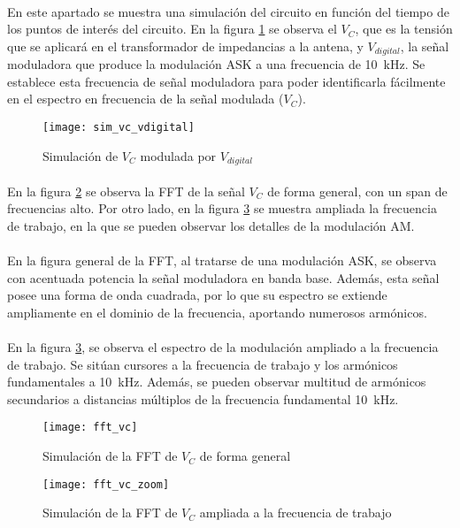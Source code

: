 \paragraph{}
En este apartado se muestra una simulación del circuito en función del tiempo de los puntos de interés del circuito. 
En la figura \ref{fig:sim_vc_vdig} se observa el $V_C$, que es la tensión que se aplicará en el transformador de impedancias a la antena, y $V_{digital}$, la señal moduladora que produce la modulación ASK a una frecuencia de \SI{10}{\kilo\hertz}. Se establece esta frecuencia de señal moduladora para poder identificarla fácilmente en el espectro en frecuencia de la señal modulada ($V_C$).
\begin{figure}[h]
    \centering
    \texttt{[image: sim\_vc\_vdigital]}
    \caption{Simulaci\'on de $V_C$ modulada por $V_{digital}$}
    \label{fig:sim_vc_vdig}
\end{figure}
\paragraph{}
En la figura \ref{fig:sim_fft} se observa la FFT de la señal $V_C$ de forma general, con un span de frecuencias alto. Por otro lado, en la figura \ref{fig:sim_fft_zoom} se muestra ampliada la frecuencia de trabajo, en la que se pueden observar los detalles de la modulación AM.
\paragraph{}
En la figura general de la FFT, al tratarse de una modulación ASK, se observa con acentuada potencia la señal moduladora en banda base. Además, esta señal posee una forma de onda cuadrada, por lo que su espectro se extiende ampliamente en el dominio de la frecuencia, aportando numerosos armónicos.
\paragraph{}
En la figura \ref{fig:sim_fft_zoom}, se observa el espectro de la modulación ampliado a la frecuencia de trabajo. Se sitúan cursores a la frecuencia de trabajo y los armónicos fundamentales a \SI{10}{\kilo\hertz}. Además, se pueden observar multitud de armónicos secundarios a distancias múltiplos de la frecuencia fundamental \SI{10}{\kilo\hertz}.
\begin{figure}[h!]
    \centering
    \texttt{[image: fft\_vc]}
    \caption{Simulaci\'on de la FFT de $V_C$ de forma general}
    \label{fig:sim_fft}
\end{figure}
\begin{figure}[h!]
    \centering
    \texttt{[image: fft\_vc\_zoom]}
    \caption{Simulaci\'on de la FFT de $V_C$ ampliada a la frecuencia de trabajo}
    \label{fig:sim_fft_zoom}
\end{figure}

